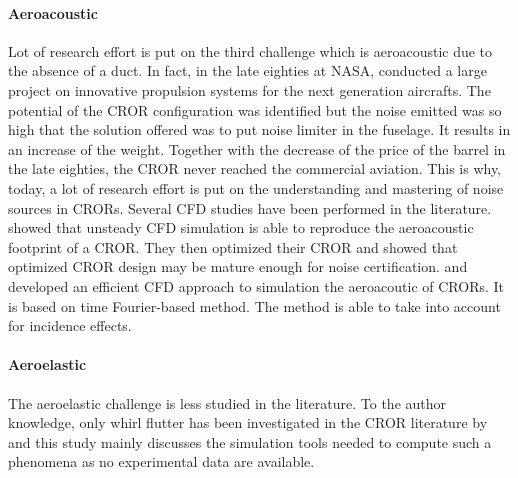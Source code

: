 \paragraph{Aeroacoustic}
Lot of research effort is put on the third challenge which
is aeroacoustic due to the absence of a duct. 
In fact, in the late eighties at NASA, \citet{Hager1988}
conducted a large project on innovative propulsion systems for the
next generation aircrafts. The potential of the CROR configuration
was identified but the noise emitted was so high that the solution
offered was to put noise limiter in the fuselage. It results in 
an increase of the weight. Together with the decrease of the price of the
barrel in the late eighties, the CROR never reached the commercial
aviation. This is why, today, a lot of research effort is put on the
understanding and mastering of noise sources in CRORs.
Several CFD studies have been performed in the literature.
\citet{Peters2012} showed that unsteady CFD simulation is able
to reproduce the aeroacoustic footprint of a CROR. They then optimized
their CROR and showed that optimized CROR design may be mature enough
for noise certification. \citet{Hoffer2012} and \citet{Ferrante2013}
developed an efficient CFD approach to simulation the aeroacoutic of CRORs.
It is based on time Fourier-based method. The method is able to
take into account for incidence effects.

\paragraph{Aeroelastic}
The aeroelastic challenge is less studied in the literature.
To the author knowledge, only whirl flutter has been investigated
in the CROR literature by \citet{Verley2013} and this study mainly
discusses the simulation tools needed to compute such a phenomena as
no experimental data are available.
